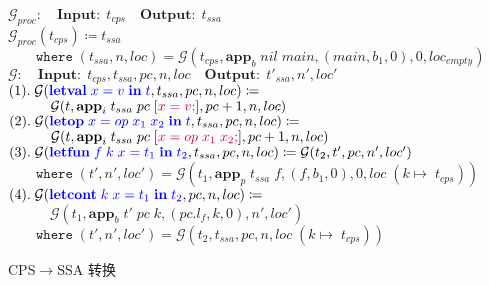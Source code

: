 \begin{figure}[!ht]
    \centering
    \vspace{2ex}
    \begin{algorithm}[H]
        \caption{CPS$\rightarrow $SSA 转换}
        \SetAlgoLined
        $\mathcal{G}_{proc}:\quad \mathbf{Input:}\; t_{cps}\quad \mathbf{Output:}\; t_{ssa}$\\
        $\mathcal{G}_{proc}(t_{cps})\coloneqq t_{ssa}  $\\
        $\quad\quad \mathtt{where}\; (t_{ssa}, n, loc) = \mathbf{\mathcal{G}}(t_{cps}, \mathbf{app}_b\; nil\; main, (main, b_1, 0), 0, loc_{empty}) $\\
        \vspace*{0.5em}
        $ \mathbf{\mathcal{G}}:\quad \mathbf{Input:}\; t_{cps}, t_{ssa}, pc, n, loc\quad \mathbf{Output:}\; t'_{ssa}, n', loc' $ \\
        $ (1).\; \mathbf{\mathcal{G}}(\textcolor{blue}{\mathbf{letval}\; x=v\; \mathbf{in}\; t}, t_{ssa}, pc, n, loc) \coloneqq  $ \\
        $ \quad\quad\quad \mathbf{\mathcal{G}}(t, \mathbf{app}_i\; t_{ssa}\; pc\; [\textcolor{purple}{x=v;}], pc+1, n, loc) $ \\
        $ (2).\; \mathbf{\mathcal{G}}(\textcolor{blue}{\mathbf{letop}\; x=op\; x_1\; x_2\; \mathbf{in}\; t}, t_{ssa}, pc, n, loc) \coloneqq  $ \\
        $ \quad\quad\quad \mathbf{\mathcal{G}}(t, \mathbf{app}_i\; t_{ssa}\; pc\; [\textcolor{purple}{x=op\; x_1\; x_2;}], pc+1, n, loc) $ \\
        $ (3).\; \mathbf{\mathcal{G}}(\textcolor{blue}{\mathbf{letfun}\; f\; k\; x=t_1\; \mathbf{in}\; t_2}, t_{ssa}, pc, n, loc) \coloneqq \mathbf{\mathcal{G}}(t_2, t', pc, n', loc') $ \\
        $ \quad\quad \mathtt{where}\; (t', n', loc') = \mathbf{\mathcal{G}}(t_1, \mathbf{app}_p\; t_{ssa}\; f, (f, b_1, 0), 0, loc\; (k\mapsto\; t_{cps})) $ \\
        $ (4).\; \mathbf{\mathcal{G}}(\textcolor{blue}{\mathbf{letcont}\; k\; x=t_1\; \mathbf{in}\; t_2}, pc, n, loc) \coloneqq  $ \\
        $ \quad\quad\quad  \mathbf{\mathcal{G}}(t_1, \mathbf{app}_b\; t'\; pc\; k, (pc.l_f, k, 0), n', loc') $ \\
        $ \quad\quad \mathtt{where}\; (t', n', loc') = \mathbf{\mathcal{G}}(t_2, t_{ssa}, pc, n, loc\; (k\mapsto\; t_{cps})) $ \\

\end{algorithm}
\end{figure}
